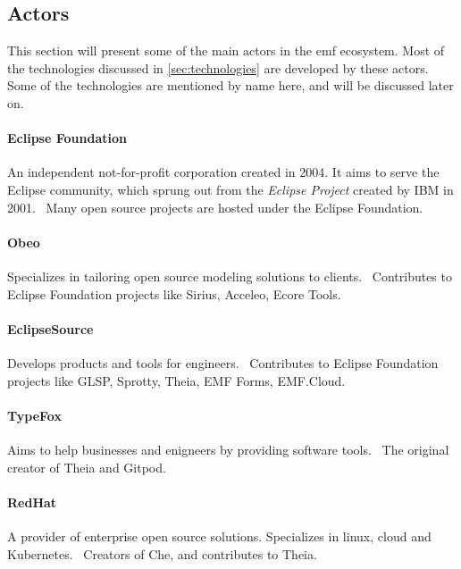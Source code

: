 \subsection{Actors}

This section will present some of the main actors in the \acrlong{emf} ecosystem.
Most of the technologies discussed in \cref{sec:technologies} are developed by these actors.
Some of the technologies are mentioned by name here, and will be discussed later on.

\paragraph*{Eclipse Foundation} %
An independent not-for-profit corporation created in 2004.
It aims to serve the Eclipse community, which sprung out from the \emph{Eclipse Project} created by IBM in 2001.~\cite{m.milinkovichEclipseFoundationEclipse2005}
Many \gls{open source} projects are hosted under the Eclipse Foundation.

\paragraph*{Obeo} %
Specializes in tailoring \gls{open source} modeling solutions to clients.~\cite{ObeoFewWords}
Contributes to Eclipse Foundation projects like Sirius, Acceleo, Ecore Tools.~\cite{ObeoProductsPresentation}

\paragraph*{EclipseSource} %
Develops products and tools for engineers.~\cite{eclipsesourceServices}
Contributes to Eclipse Foundation projects like GLSP, Sprotty, Theia, EMF Forms, EMF.Cloud.~\cite{guindonEclipseMembershipEclipseSource}

\paragraph*{TypeFox} %
Aims to help businesses and enigneers by providing software tools.~\cite{typefoxTypeFoxSmartTools}
The original creator of Theia and Gitpod.

\paragraph*{RedHat} %
A provider of enterprise \gls{open source} solutions.
Specializes in linux, \gls{cloud} and \gls{Kubernetes}.~\cite{redhatWorldOpenSource}
Creators of Che, and contributes to Theia.

